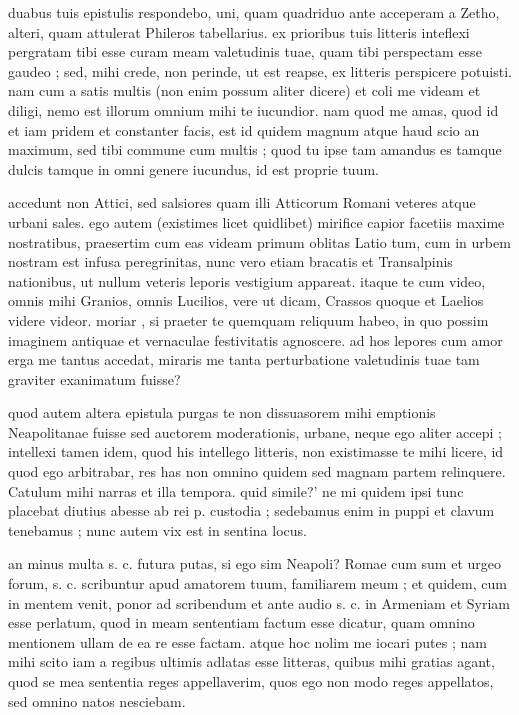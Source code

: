 


 duabus tuis epistulis respondebo, uni, quam quadriduo ante acceperam a Zetho, alteri, quam attulerat Phileros tabellarius. ex prioribus tuis litteris inteflexi pergratam tibi esse curam meam valetudinis tuae, quam tibi perspectam esse gaudeo ; sed, mihi crede, non perinde, ut est reapse, ex litteris perspicere potuisti. nam cum a satis multis (non enim possum aliter dicere) et coli me videam et diligi, nemo est illorum omnium mihi te iucundior. nam quod me amas, quod id et iam pridem et constanter facis, est id quidem magnum atque haud scio an maximum, sed tibi commune cum multis ; quod tu ipse tam amandus es tamque dulcis tamque in omni genere iucundus, id est proprie tuum.

 accedunt non Attici, sed salsiores quam illi Atticorum Romani veteres atque urbani sales. ego autem (existimes licet quidlibet) mirifice capior facetiis maxime nostratibus, praesertim cum eas videam primum oblitas Latio tum, cum in urbem nostram est infusa peregrinitas, nunc vero etiam bracatis et Transalpinis nationibus, ut nullum veteris leporis vestigium appareat. itaque te cum video, omnis mihi Granios, omnis Lucilios, vere ut dicam, Crassos quoque et Laelios videre videor. moriar , si praeter te quemquam reliquum habeo, in quo possim imaginem antiquae et vernaculae festivitatis agnoscere. ad hos lepores cum amor erga me tantus accedat, miraris me tanta perturbatione valetudinis tuae tam graviter exanimatum fuisse?

 quod autem altera epistula purgas te non dissuasorem mihi emptionis Neapolitanae fuisse sed auctorem moderationis, urbane, neque ego aliter accepi ; intellexi tamen idem, quod his intellego litteris, non existimasse te mihi licere, id quod ego arbitrabar, res has non omnino quidem sed magnam partem relinquere. Catulum mihi narras et illa tempora. quid simile?' ne mi quidem ipsi tunc placebat diutius abesse ab rei p. custodia ; sedebamus enim in puppi et clavum tenebamus ; nunc autem vix est in sentina locus.

 an minus multa s. c. futura putas, si ego sim Neapoli? Romae cum sum et urgeo forum, s. c. scribuntur apud amatorem tuum, familiarem meum ; et quidem, cum in mentem venit, ponor ad scribendum et ante audio s. c. in Armeniam et Syriam esse perlatum, quod in meam sententiam factum esse dicatur, quam omnino mentionem ullam de ea re esse factam. atque hoc nolim me iocari putes ; nam mihi scito iam a regibus ultimis adlatas esse litteras, quibus mihi gratias agant, quod se mea sententia reges appellaverim, quos ego non modo reges appellatos, sed omnino natos nesciebam.

